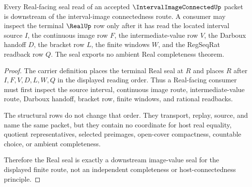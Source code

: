 \begin{theorem}
\label{thm:interval-image-connected-real-seal}
Every Real-facing seal read of an accepted $\IntervalImageConnectedUp$ packet is downstream of the interval-image connectedness route. A consumer may inspect the terminal $\RealUp$ row only after it has read the located interval source $I$, the continuous image row $F$, the intermediate-value row $V$, the Darboux handoff $D$, the bracket row $L$, the finite windows $W$, and the RegSeqRat readback row $Q$. The seal exports no ambient Real completeness theorem.
\end{theorem}
\begin{proof}
The carrier definition places the terminal Real seal at $R$ and places $R$ after $I,F,V,D,L,W,Q$ in the displayed reading order. Thus a Real-facing consumer must first inspect the source interval, continuous image route, intermediate-value route, Darboux handoff, bracket row, finite windows, and rational readbacks.

The structural rows do not change that order. They transport, replay, source, and name the same packet, but they contain no coordinate for host real equality, quotient representatives, selected preimages, open-cover compactness, countable choice, or ambient completeness.

Therefore the Real seal is exactly a downstream image-value seal for the displayed finite route, not an independent completeness or host-connectedness principle.
\end{proof}


